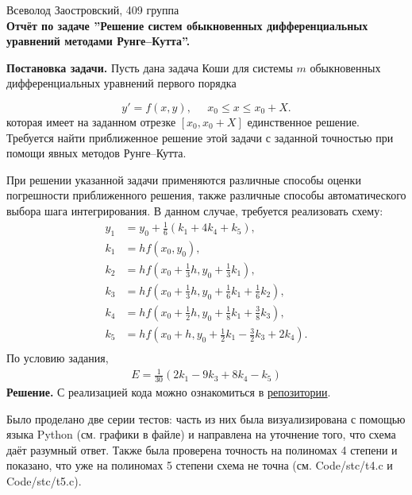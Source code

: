 \documentclass[14pt,a4paper]{extarticle}
\newcommand{\1}{\mathbbm{1}}
\begin{document}
\begin{center}

    {Всеволод Заостровский, 409 группа}\\
    {\bfseries Отчёт по задаче ''Решение систем обыкновенных дифференциальных уравнений методами Рунге--Кутта''.\\}
    \vspace{1cm}

\end{center}

\textbf{Постановка задачи.} Пусть дана задача Коши для системы $m$ обыкновенных 
дифференциальных уравнений первого порядка

\begin{equation}
    y' = f(x, y), \;\;\;\;\; x_0 \leq x \leq x_0 + X .
\end{equation}
которая имеет на заданном отрезке $[x_0, x_0+X]$ единственное решение. Требуется
найти приближенное решение этой задачи с заданной точностью при помощи
явных методов Рунге–Кутта.
\par
При решении указанной задачи применяются различные способы оценки
погрешности приближенного решения, также различные способы автоматического 
выбора шага интегрирования. В данном случае, требуется реализовать схему:
\begin{align*}
    y_1 &= y_0 + \frac{1}{6} (k_1 + 4 k_4 + k_5), \\
    k_1 &= h f(x_0, y_0), \\
    k_2 &= h f\left( x_0 + \frac{1}{3}h, y_0 + \frac{1}{3} k_1\right), \\
    k_3 &= h f\left( x_0 + \frac{1}{3}h, y_0 + \frac{1}{6} k_1 + \frac{1}{6} k_2\right), \\
    k_4 &= h f\left( x_0 + \frac{1}{2}h, y_0 + \frac{1}{8} k_1 + \frac{3}{8} k_3\right), \\
    k_5 &= h f\left( x_0 +            h, y_0 + \frac{1}{2} k_1 - \frac{3}{2} k_3 + 2 k_4\right). \\
\end{align*}
По условию задания, 
\begin{align*}
    E = \frac{1}{30} (2 k_1 - 9 k_3 + 8 k_4 - k_5)
\end{align*}
\textbf{Решение.} С реализацией кода можно ознакомиться 
в \href{https://github.com/VsevolodZaostrovsky/NumericalMethods/tree/main/Differential%20Equations/Code/src}{репозитории}. 

Было проделано две серии тестов: часть из них была визуализирована с помощью языка Python (см. графики в файле) 
и направлена на уточнение того, что схема даёт разумный ответ.
Также была проверена точность на полиномах 4 степени и показано, что уже на полиномах 5 степени схема не точна (см. Code/stc/t4.c и Code/stc/t5.c). 
\end{document}
